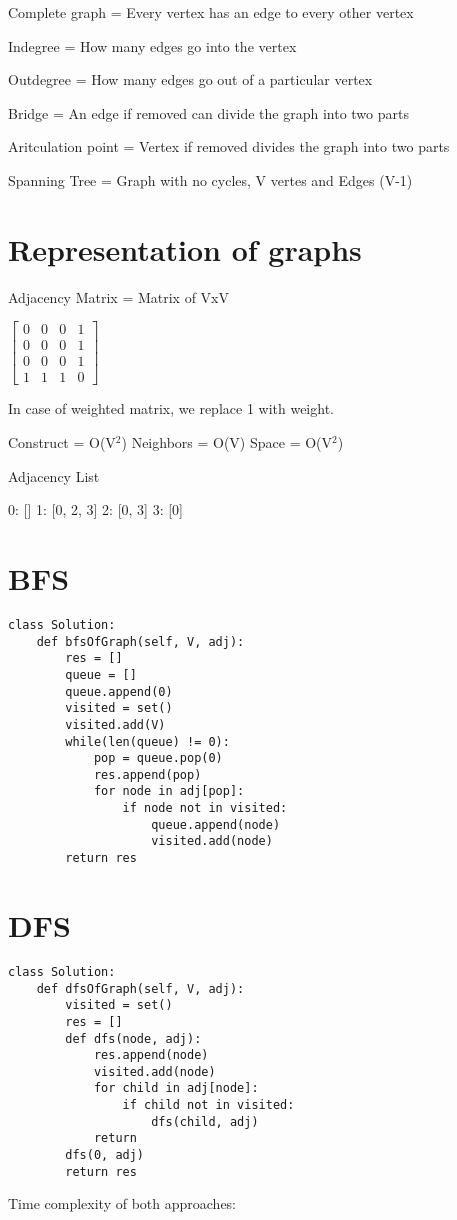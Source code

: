 \documentclass[24pt, a4]{article}
\begin{document}
Complete graph = Every vertex has an edge to every other vertex

Indegree = How many edges go into the vertex

Outdegree = How many edges go out of a particular vertex

Bridge = An edge if removed can divide the graph into two parts

Aritculation point = Vertex if removed divides the graph into two parts

Spanning Tree = Graph with no cycles, V vertes and Edges (V-1)

\section{Representation of graphs}
Adjacency Matrix = Matrix of VxV

$\begin{bmatrix}
0 & 0 & 0 & 1 \\
0 & 0 & 0 & 1 \\
0 & 0 & 0 & 1 \\
1 & 1 & 1 & 0 
\end{bmatrix}$

In case of weighted matrix, we replace 1 with weight.

Construct = O(V$^2$)
Neighbors = O(V)
Space = O(V$^2$)

Adjacency List

0: []
1: [0, 2, 3]
2: [0, 3]
3: [0]

\section{BFS}
\begin{lstlisting}
class Solution:
    def bfsOfGraph(self, V, adj):
        res = []
        queue = []
        queue.append(0)
        visited = set()
        visited.add(V)
        while(len(queue) != 0):
            pop = queue.pop(0)
            res.append(pop)
            for node in adj[pop]:
                if node not in visited:
                    queue.append(node)
                    visited.add(node)
        return res
\end{lstlisting}
\newpage
\section{DFS}
\begin{lstlisting}
class Solution:
    def dfsOfGraph(self, V, adj):
        visited = set()
        res = []
        def dfs(node, adj):
            res.append(node)
            visited.add(node)
            for child in adj[node]:
                if child not in visited:
                    dfs(child, adj)
            return
        dfs(0, adj)
        return res
\end{lstlisting}
Time complexity of both approaches:
\end{document}

